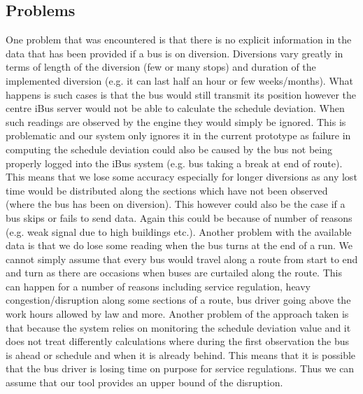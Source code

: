 \subsection{Problems}
One problem that was encountered is that there is no explicit information in the data that has been provided if a bus is on diversion. Diversions vary greatly in terms of length of the diversion (few or many stops) and duration of the implemented diversion (e.g. it can last half an hour or few weeks/months). What happens is such cases is that the bus would still transmit its position however the centre iBus server would not be able to calculate the schedule deviation. When such readings are observed by the engine they would simply be ignored. This is problematic and our system only ignores it in the current prototype as failure in computing the schedule deviation could also be caused by the bus not being properly logged into the iBus system (e.g. bus taking a break at end of route). This means that we lose some accuracy especially for longer diversions as any lost time would be distributed along the sections which have not been observed (where the bus has been on diversion). This however could also be the case if a bus skips or fails to send data. Again this could be because of number of reasons (e.g. weak signal due to high buildings etc.).
Another problem with the available data is that we do lose some reading when the bus turns at the end of a run. We cannot simply assume that every bus would travel along a route from start to end and turn as there are occasions when buses are curtailed along the route. This can happen for a number of reasons including service regulation, heavy congestion/disruption along some sections of a route, bus driver going above the work hours allowed by law and more.
Another problem of the approach taken is that because the system relies on monitoring the schedule deviation value and it does not treat differently calculations where during the first observation the bus is ahead or schedule and when it is already behind. This means that it is possible that the bus driver is losing time on purpose for service regulations. Thus we can assume that our tool provides an upper bound of the disruption.

